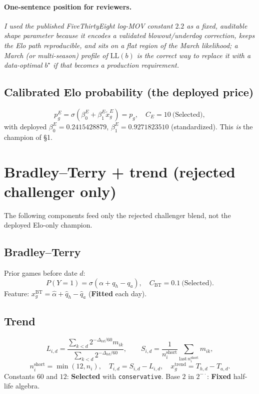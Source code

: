 \documentclass[10pt]{article}
\newcommand{\cls}[1]{\textbf{#1}}
\begin{document}
\paragraph{One-sentence position for reviewers.}
\textit{I used the published FiveThirtyEight log-MOV constant \(2.2\) as a fixed,
auditable shape parameter because it encodes a validated blowout/underdog
correction, keeps the Elo path reproducible, and sits on a flat region of the
March likelihood; a March (or multi-season) profile of \(\mathrm{LL}(b)\) is the
correct way to replace it with a data-optimal \(b^\star\) if that becomes a
production requirement.}

\subsection{Calibrated Elo probability (the deployed price)}
\[
p_g^{E}
=
\sigma(\beta_0^{E}+\beta_1^{E}\tilde x_g^{E})
= p_g,
\quad C_E=10\ \text{(Selected)},
\]
with deployed \(\beta_0^{E}=0.2415428879\), \(\beta_1^{E}=0.9271823510\)
(standardized). This \emph{is} the champion of \S1.

\section{Bradley--Terry + trend (rejected challenger only)}

The following components feed only the rejected challenger blend, not the
deployed Elo-only champion.

\subsection{Bradley--Terry}
Prior games before date \(d\):
\[
P(Y=1)=\sigma(\alpha+q_h-q_a),
\quad C_{\mathrm{BT}}=0.1\ \text{(Selected)}.
\]
Feature: \(x_g^{\mathrm{BT}}=\hat\alpha+\hat q_h-\hat q_a\) (\cls{Fitted} each day).

\subsection{Trend}
\[
L_{i,d}
=
\frac{\sum_{k<d} 2^{-\Delta_{kd}/60} m_{ik}}{\sum_{k<d} 2^{-\Delta_{kd}/60}},
\qquad
S_{i,d}
=
\frac{1}{n_i^{\mathrm{short}}}\sum_{\mathrm{last}\,n_i^{\mathrm{short}}} m_{ik},
\]
\[
n_i^{\mathrm{short}}=\min(12,n_i),
\quad
T_{i,d}=S_{i,d}-L_{i,d},
\quad
x_g^{\mathrm{trend}}=T_{h,d}-T_{a,d}.
\]
Constants \(60\) and \(12\): \cls{Selected} with \texttt{conservative}.
Base \(2\) in \(2^{-\cdot}\): \cls{Fixed} half-life algebra.
\end{document}
